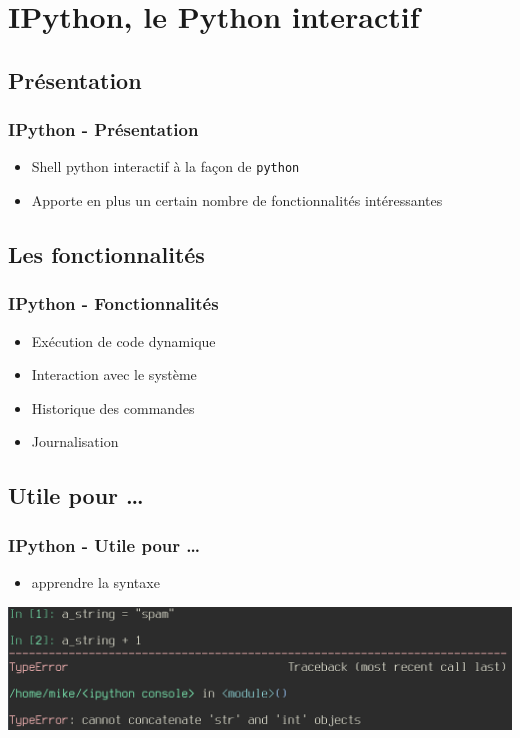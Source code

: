 \section{IPython, le Python interactif}

\subsection{Présentation}
\begin{frame}[fragile]
  \frametitle{IPython - Présentation}
  \begin{itemize}
    \item Shell python interactif à la façon de \verb=python=
    \item Apporte en plus un certain nombre de fonctionnalités intéressantes
  \end{itemize}
\end{frame}

\subsection{Les fonctionnalités}
\begin{frame}
  \frametitle{IPython - Fonctionnalités}
  \begin{itemize}
    \item Exécution de code dynamique
    \item Interaction avec le système
    \item Historique des commandes
    \item Journalisation
  \end{itemize}
\end{frame}

\subsection{Utile pour \ldots}
\begin{frame}[fragile]
  \frametitle{IPython - Utile pour \ldots}
    \begin{itemize}
      \item apprendre la syntaxe
    \end{itemize}
  \includegraphics[scale=0.35]{apprendre.png}

\end{frame}


